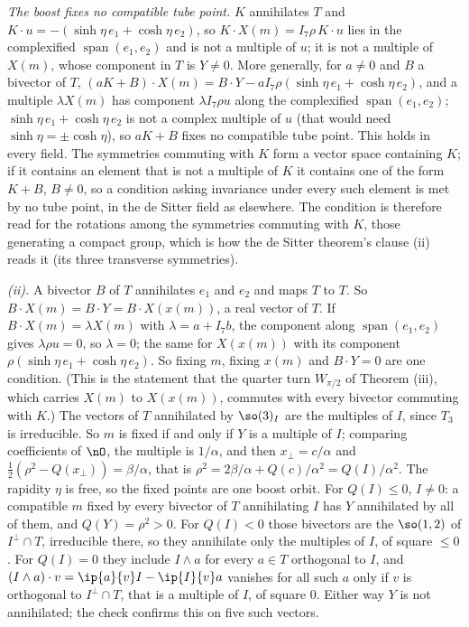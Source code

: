 \emph{The boost fixes no compatible tube point.} $K$ annihilates $T$ and $K \cdot u = -(\sinh\eta\,e_{1} + \cosh\eta\,e_{2})$, so $K \cdot X(m) = I_{7}\rho\,K \cdot u$ lies in the complexified $\operatorname{span}(e_{1}, e_{2})$ and is not a multiple of $u$; it is not a multiple of $X(m)$, whose component in $T$ is $Y \neq 0$. More generally, for $a \neq 0$ and $B$ a bivector of $T$, $(aK + B) \cdot X(m) = B \cdot Y - aI_{7}\rho(\sinh\eta\,e_{1} + \cosh\eta\,e_{2})$, and a multiple $\lambda X(m)$ has component $\lambda I_{7}\rho u$ along the complexified $\operatorname{span}(e_{1}, e_{2})$; $\sinh\eta\,e_{1} + \cosh\eta\,e_{2}$ is not a complex multiple of $u$ (that would need $\sinh\eta = \pm\cosh\eta$), so $aK + B$ fixes no compatible tube point. This holds in every field. The symmetries commuting with $K$ form a vector space containing $K$; if it contains an element that is not a multiple of $K$ it contains one of the form $K + B$, $B \neq 0$, so a condition asking invariance under every such element is met by no tube point, in the de Sitter field as elsewhere. The condition is therefore read for the rotations among the symmetries commuting with $K$, those generating a compact group, which is how the de Sitter theorem's clause (ii) reads it (its three transverse symmetries).

\emph{(ii).} A bivector $B$ of $T$ annihilates $e_{1}$ and $e_{2}$ and maps $T$ to $T$. So $B \cdot X(m) = B \cdot Y = B \cdot X(x(m))$, a real vector of $T$. If $B \cdot X(m) = \lambda X(m)$ with $\lambda = a + I_{7}b$, the component along $\operatorname{span}(e_{1}, e_{2})$ gives $\lambda\rho u = 0$, so $\lambda = 0$; the same for $X(x(m))$ with its component $\rho(\sinh\eta\,e_{1} + \cosh\eta\,e_{2})$. So fixing $m$, fixing $x(m)$ and $B \cdot Y = 0$ are one condition. (This is the statement that the quarter turn $W_{\pi/2}$ of Theorem (iii), which carries $X(m)$ to $X(x(m))$, commutes with every bivector commuting with $K$.) The vectors of $T$ annihilated by $\so(3)_{I}$ are the multiples of $I$, since $T_{3}$ is irreducible. So $m$ is fixed if and only if $Y$ is a multiple of $I$; comparing coefficients of $\nO$, the multiple is $1/\alpha$, and then $x_{\perp} = c/\alpha$ and $\tfrac12(\rho^{2} - Q(x_{\perp})) = \beta/\alpha$, that is $\rho^{2} = 2\beta/\alpha + Q(c)/\alpha^{2} = Q(I)/\alpha^{2}$. The rapidity $\eta$ is free, so the fixed points are one boost orbit. For $Q(I) \le 0$, $I \neq 0$: a compatible $m$ fixed by every bivector of $T$ annihilating $I$ has $Y$ annihilated by all of them, and $Q(Y) = \rho^{2} > 0$. For $Q(I) < 0$ those bivectors are the $\so(1,2)$ of $I^{\perp} \cap T$, irreducible there, so they annihilate only the multiples of $I$, of square $\le 0$. For $Q(I) = 0$ they include $I \wedge a$ for every $a \in T$ orthogonal to $I$, and $(I \wedge a) \cdot v = \ip{a}{v}I - \ip{I}{v}a$ vanishes for all such $a$ only if $v$ is orthogonal to $I^{\perp} \cap T$, that is a multiple of $I$, of square $0$. Either way $Y$ is not annihilated; the check confirms this on five such vectors.

